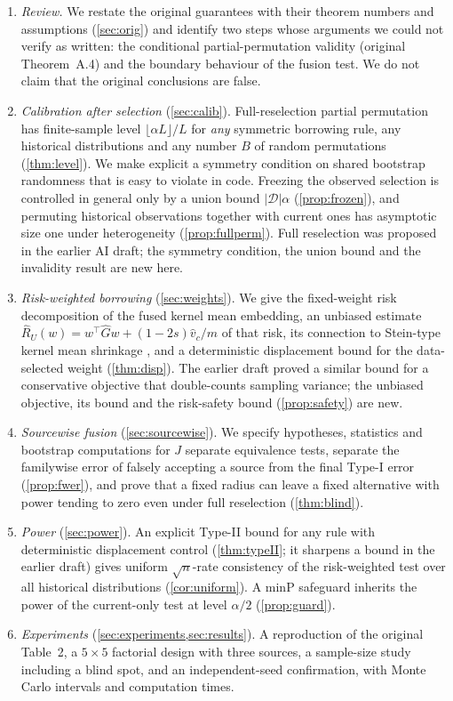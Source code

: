 \documentclass[11pt,a4paper]{article}
\begin{document}
\begin{enumerate}[leftmargin=1.4em,itemsep=2pt]
\item \emph{Review.} We restate the original guarantees with their theorem numbers and assumptions (\cref{sec:orig}) and identify two steps whose arguments we could not verify as written: the conditional partial-permutation validity (original Theorem~A.4) and the boundary behaviour of the fusion test. We do not claim that the original conclusions are false.
\item \emph{Calibration after selection} (\cref{sec:calib}). Full-reselection partial permutation has finite-sample level $\lfloor\alpha L\rfloor/L$ for \emph{any} symmetric borrowing rule, any historical distributions and any number $B$ of random permutations (\cref{thm:level}). We make explicit a symmetry condition on shared bootstrap randomness that is easy to violate in code. Freezing the observed selection is controlled in general only by a union bound $|\mathcal D|\alpha$ (\cref{prop:frozen}), and permuting historical observations together with current ones has asymptotic size one under heterogeneity (\cref{prop:fullperm}). Full reselection was proposed in the earlier AI draft; the symmetry condition, the union bound and the invalidity result are new here.
\item \emph{Risk-weighted borrowing} (\cref{sec:weights}). We give the fixed-weight risk decomposition of the fused kernel mean embedding, an unbiased estimate $\hat R_U(w)=w^\top\hat G w+(1-2s)\hat v_c/m$ of that risk, its connection to Stein-type kernel mean shrinkage \citep{muandet2016}, and a deterministic displacement bound for the data-selected weight (\cref{thm:disp}). The earlier draft proved a similar bound for a conservative objective that double-counts sampling variance; the unbiased objective, its bound and the risk-safety bound (\cref{prop:safety}) are new.
\item \emph{Sourcewise fusion} (\cref{sec:sourcewise}). We specify hypotheses, statistics and bootstrap computations for $J$ separate equivalence tests, separate the familywise error of falsely accepting a source from the final Type-I error (\cref{prop:fwer}), and prove that a fixed radius can leave a fixed alternative with power tending to zero even under full reselection (\cref{thm:blind}).
\item \emph{Power} (\cref{sec:power}). An explicit Type-II bound for any rule with deterministic displacement control (\cref{thm:typeII}; it sharpens a bound in the earlier draft) gives uniform $\sqrt n$-rate consistency of the risk-weighted test over all historical distributions (\cref{cor:uniform}). A minP safeguard inherits the power of the current-only test at level $\alpha/2$ (\cref{prop:guard}).
\item \emph{Experiments} (\cref{sec:experiments,sec:results}). A reproduction of the original Table~2, a $5\times5$ factorial design with three sources, a sample-size study including a blind spot, and an independent-seed confirmation, with Monte Carlo intervals and computation times.
\end{enumerate}
\end{document}
